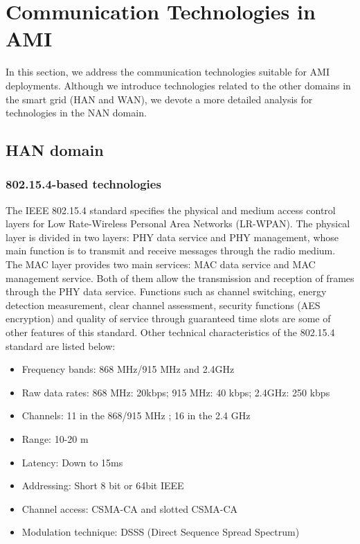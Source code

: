 \documentclass[11pt,draftclsnofoot,onecolumn]{IEEEtran}
\begin{document}
\section{Communication Technologies in AMI}\label{technologies}

In this section, we address the communication technologies suitable for AMI deployments. Although we introduce technologies related to the other domains in the smart grid (HAN and WAN), we devote a more detailed analysis for technologies in the NAN domain. 

\subsection{HAN domain}

\subsubsection{802.15.4-based technologies}\label{tech::802154}

The IEEE 802.15.4 standard specifies the physical and medium access control layers for Low Rate-Wireless Personal Area Networks (LR-WPAN). The physical layer is divided in two layers: PHY data service and PHY management, whose main function is to transmit and receive messages through the radio medium. The MAC layer provides two main services: MAC data service and MAC management service. Both of them allow the transmission and reception of frames through the PHY data service. Functions such as channel switching, energy detection measurement, clear channel assessment, security functions (AES encryption) and quality of service through guaranteed time slots are some of other features of this standard. Other technical characteristics of the 802.15.4 standard are listed below:

\begin{itemize}
	\item Frequency bands: 868 MHz/915 MHz and 2.4GHz
	\item Raw data rates: 868 MHz: 20kbps; 915 MHz: 40 kbps; 2.4GHz: 250 kbps
	\item Channels: 11 in the 868/915 MHz ; 16 in the 2.4 GHz
	\item Range: 10-20 m
	\item Latency: Down to 15ms
	\item Addressing: Short  8 bit or 64bit IEEE
	\item Channel access: CSMA-CA and slotted CSMA-CA
	\item Modulation technique: DSSS (Direct Sequence Spread Spectrum)
\end{itemize}  
\end{document}
